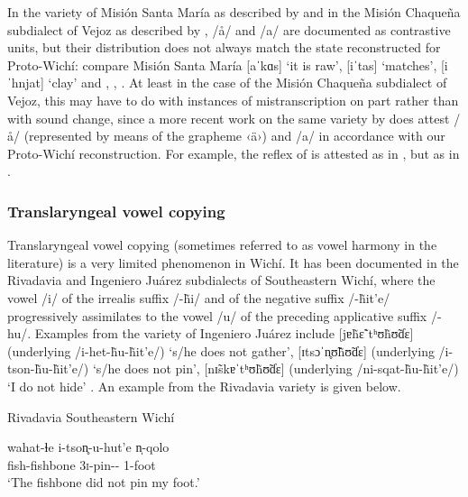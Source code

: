 In the variety of Misión Santa María as described by \citet{SS07} and in the Misión Chaqueña subdialect of Vejoz as described by \citet{VU74}, /å/ and /a/ are documented as contrastive units, but their distribution does not always match the state reconstructed for Proto-Wichí: compare Misión Santa María [aˈkɑs] `it is raw', [iˈtas] `matches', [iˈhnjat] `clay' and , ,  \citep[168]{SS07,AFG-SS-09}. At least in the case of the Misión Chaqueña subdialect of Vejoz, this may have to do with instances of mistranscription on  part rather than with sound change, since a more recent work on the same variety by \citet{MG-MELO15} does attest /å/ (represented by means of the grapheme ‹ä›) and /a/ in accordance with our Proto-Wichí reconstruction. For example, the reflex of  is attested as  in \citet[65]{VU74}, but as  in \citet[15, 79]{MG-MELO15}.

\subsubsection{Translaryngeal vowel copying}\label{wi-vh}

Translaryngeal vowel copying (sometimes referred to as vowel harmony in the literature) is a very limited phenomenon in Wichí. It has been documented in the Rivadavia and Ingeniero Juárez subdialects of Southeastern Wichí, where the vowel /i/ of the irrealis suffix /\mbox{-}h̃i/ and of the negative suffix /\mbox{-}h̃it’e/ progressively  assimilates to the vowel /u/ of the preceding applicative suffix /\mbox{-}hu/. Examples from the variety of Ingeniero Juárez include [jɐh̃ɛ̃ˈtʰʊh̃ʊ̃ɗɛ] (underlying /i\mbox{-}het\mbox{-}h̃u\mbox{-}h̃it’e/) `s/he does not gather', [ɪtsɔˈn̥ʊ̃h̃ʊ̃ɗɛ] (underlying /i\mbox{-}tson\mbox{-}h̃u\mbox{-}h̃it’e/) `s/he does not pin', [nɪ̃skɐˈtʰʊh̃ʊ̃ɗɛ] (underlying /ni\mbox{-}sqat\mbox{-}h̃u\mbox{-}h̃it’e/) `I do not hide' \citep[97]{LCB-MBC09}. An example from the Rivadavia variety is given below.

\ea
Rivadavia Southeastern Wichí \citep[50]{JT09-th}\\
    \begin{xlist}
        \ex\gll wahat-ɬe i-tson̥-u-hut’e n̩-qolo\\
                fish-fishbone 3{\textsc{i}}-pin-\APPL-{\NEG} 1\SG-foot\\
                \glt `The fishbone did not pin my foot.'
    \end{xlist}
\z

